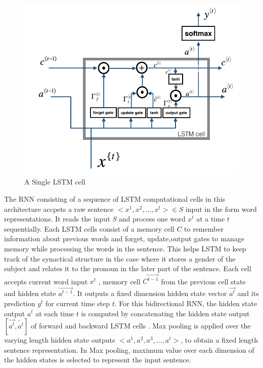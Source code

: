 \documentclass[12pt]{report} %
\begin{document}
	
	\begin{figure}[!tbp]
		\centering
		\includegraphics[scale=0.40]{image/LSTM.png}
		\caption{A Single LSTM cell \citep{SeqMod2018Andrew}}
		\label{lstm}
	\end{figure}
	
	 The RNN consisting of a sequence of LSTM computational cells in this architecture accpets a raw sentence $<x^{1},x^{2},...,x^{t}> \in S$ input in the form word representations. It reads the input \textit{S} and process one word $x^{t}$ at a time $t$ sequentially. Each LSTM cells consist of a memory cell $C$ to remember information about previous words and forget, update,output gates to manage memory while processing the words in the sentence. This helps LSTM to keep track of the synactical structure in the case where it stores a gender of the subject and relates it to the pronoun in the later part of the sentence. Each cell accepts current word input $x^{t}$ , memory cell $\overrightarrow{C^{t-1}}$ from the previous cell state and hidden state $\overrightarrow{a^{t-1}}$. It outputs a fixed dimension hidden state vector $\overrightarrow{a^{t}}$ and its prediction $y^{t}$ for current time step $t$. For this bidirectional RNN, the hidden state output $ a^{t} $ at each time $ t $ is computed by concatenating the hidden state output $ [\overrightarrow{a^{t}},\overleftarrow{a^{t}}] $ of forward  and backward LSTM cells . Max pooling is applied over the varying length hidden state outputs $<a^{1},a^{2},a^{3},...,a^{t}> $, to obtain a fixed length sentence representation. In Max pooling, maximum value over each dimension of the hidden states is selected to represent the input sentence.
	
\end{document}
